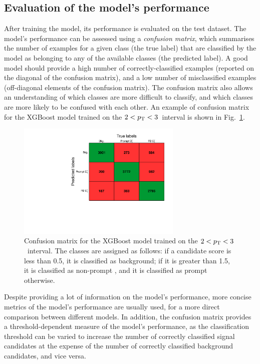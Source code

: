 \subsection{Evaluation of the model's performance}\label{sec:ml_performance}
After training the model, its performance is evaluated on the test dataset. The model's performance can be assessed using a \emph{confusion matrix}, which summarises the number of examples for a given class (the true label) that are classified by the model as belonging to any of the available classes (the predicted label). A good model should provide a high number of correctly-classified examples (reported on the diagonal of the confusion matrix), and a low number of misclassified examples (off-diagonal elements of the confusion matrix). The confusion matrix also allows an understanding of which classes are more difficult to classify, and which classes are more likely to be confused with each other. An example of confusion matrix for the XGBoost model trained on the $2<p_\mathrm{T}<3$~\gevc interval is shown in Fig.~\ref{fig:ml_confusion_matrix}.

\begin{figure}
    \centering
    \includegraphics[width=0.7\textwidth]{Figures/Chapter 5/ConfusionMatrix.pdf}
    \caption{Confusion matrix for the XGBoost model trained on the $2<p_\mathrm{T}<3$~\gevc interval. The classes are assigned as follows: if a candidate score is less than 0.5, it is classified as background; if it is greater than 1.5, it is classified as non-prompt \ds, and it is classified as prompt \ds otherwise.}
    \label{fig:ml_confusion_matrix}
\end{figure}

Despite providing a lot of information on the model's performance, more concise metrics of the model's performance are usually used, for a more direct comparison between different models. In addition, the confusion matrix provides a threshold-dependent measure of the model's performance, as the classification threshold can be varied to increase the number of correctly classified signal candidates at the expense of the number of correctly classified background candidates, and vice versa. 

